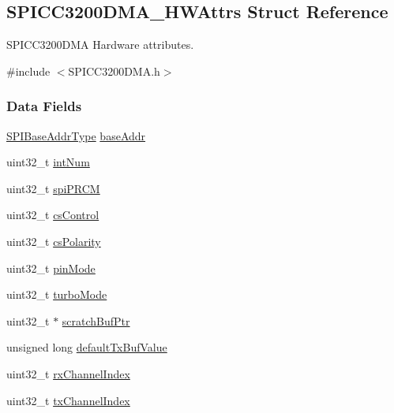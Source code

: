 \subsection{S\-P\-I\-C\-C3200\-D\-M\-A\-\_\-\-H\-W\-Attrs Struct Reference}
\label{struct_s_p_i_c_c3200_d_m_a___h_w_attrs}


S\-P\-I\-C\-C3200\-D\-M\-A Hardware attributes.  




{\ttfamily \#include $<$S\-P\-I\-C\-C3200\-D\-M\-A.\-h$>$}

\subsubsection*{Data Fields}
\begin{DoxyCompactItemize}
\item 
\hyperlink{_s_p_i_c_c3200_d_m_a_8h_a4b7e9f3739f6196bed13f9c3c549c96d}{S\-P\-I\-Base\-Addr\-Type} \hyperlink{struct_s_p_i_c_c3200_d_m_a___h_w_attrs_a9c8d969d44a09aad6ed1682708147793}{base\-Addr}
\item 
uint32\-\_\-t \hyperlink{struct_s_p_i_c_c3200_d_m_a___h_w_attrs_ac7d7cbf69297785b0f10e52232123f99}{int\-Num}
\item 
uint32\-\_\-t \hyperlink{struct_s_p_i_c_c3200_d_m_a___h_w_attrs_ab2a88ac08b007f5f2487d8ec602e78c3}{spi\-P\-R\-C\-M}
\item 
uint32\-\_\-t \hyperlink{struct_s_p_i_c_c3200_d_m_a___h_w_attrs_a572279d530e6069590aab1a4f03b9228}{cs\-Control}
\item 
uint32\-\_\-t \hyperlink{struct_s_p_i_c_c3200_d_m_a___h_w_attrs_ab88c8ae0c67eb97a7fb6c01baf63daa1}{cs\-Polarity}
\item 
uint32\-\_\-t \hyperlink{struct_s_p_i_c_c3200_d_m_a___h_w_attrs_a0083ae69b92c56f2362b9d1681c9f26c}{pin\-Mode}
\item 
uint32\-\_\-t \hyperlink{struct_s_p_i_c_c3200_d_m_a___h_w_attrs_a597af63809cded916ce7024cba02b020}{turbo\-Mode}
\item 
uint32\-\_\-t $\ast$ \hyperlink{struct_s_p_i_c_c3200_d_m_a___h_w_attrs_a6f1e2c5e6ef54893d9e3677dab809bb7}{scratch\-Buf\-Ptr}
\item 
unsigned long \hyperlink{struct_s_p_i_c_c3200_d_m_a___h_w_attrs_a37cb12ed86423d12f273637dfe2aef47}{default\-Tx\-Buf\-Value}
\item 
uint32\-\_\-t \hyperlink{struct_s_p_i_c_c3200_d_m_a___h_w_attrs_af577e5b6488f282f910e7dbd733329f4}{rx\-Channel\-Index}
\item 
uint32\-\_\-t \hyperlink{struct_s_p_i_c_c3200_d_m_a___h_w_attrs_a1ad85ea904b8d879b260e46ef44d9882}{tx\-Channel\-Index}
\end{DoxyCompactItemize}


